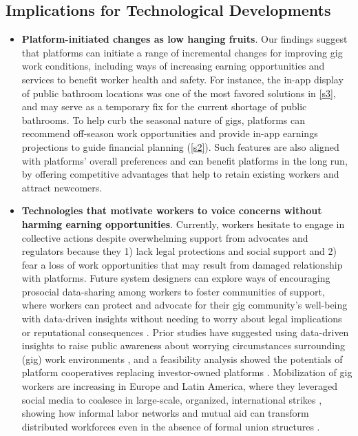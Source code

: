 \subsection{Implications for Technological Developments}
\begin{itemize}
  \item \textbf{Platform-initiated changes as low hanging fruits}. Our findings suggest that platforms can initiate a range of incremental changes for improving gig work conditions, including ways of increasing earning opportunities and services to benefit worker health and safety. For instance, the in-app display of public bathroom locations was one of the most favored solutions in \ref{s3}, and may serve as a temporary fix for the current shortage of public bathrooms. To help curb the seasonal nature of gigs, platforms can recommend off-season work opportunities and provide in-app earnings projections to guide financial planning (\ref{s2}). Such features are also aligned with platforms' overall preferences and can benefit platforms in the long run, by offering competitive advantages that help to retain existing workers and attract newcomers.   
  \item \textbf{Technologies that motivate workers to voice concerns without harming earning opportunities}. Currently, workers hesitate to engage in collective actions despite overwhelming support from advocates and regulators because they 1) lack legal protections and social support and 2) fear a loss of work opportunities that may result from damaged relationship with platforms. Future system designers can explore ways of encouraging prosocial data-sharing among workers to foster communities of support, where workers can protect and advocate for their gig community's well-being with data-driven insights without needing to worry about legal implications or reputational consequences \cite{calacci2022organizing}. Prior studies have suggested using data-driven insights to raise public awareness about worrying circumstances surrounding (gig) work environments \cite{Khovanskaya2019-xo, calacci2022organizing}, and a feasibility analysis showed the potentials of platform cooperatives replacing investor-owned platforms \cite{bunders2022feasibility}. 
  Mobilization of gig workers are increasing in Europe \cite{cini2022or} and Latin America, where they leveraged social media to coalesce in large-scale, organized, international strikes \cite{boss}, showing how informal labor networks and mutual aid can transform distributed workforces even in the absence of formal union structures \cite{qadri2021s}. 

\end{itemize}
